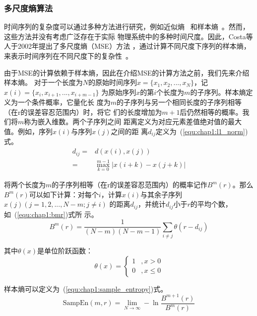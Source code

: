 \subsubsection{多尺度熵算法}

时间序列的复杂度可以通过多种方法进行研究，例如近似熵~\cite{valenza2014inhomogeneous}
和样本熵~\cite{yentes2013appropriate}。然而，这些方法并没有考虑广泛存在于实际
物理系统中的多种时间尺度。因此，Costa等人于2002年提出了多尺度熵（MSE）方法
，通过计算不同尺度下序列的样本熵，来表示时间序列在不同尺度下的复杂性~\cite{costa2002multiscale}。

由于MSE的计算依赖于样本熵，因此在介绍MSE的计算方法之前，我们先来介绍样本熵。
对于一个长度为$N$的原始时间序列$x=\{x_1, x_2, ..., x_N\}$，记$x(i)=\{x_i, x_{i+1}, ..., x_{i+m-1}\}$
为原始序列$x$的第$i$个长度为$m$的子序列。样本熵定义为一个条件概率，它量化长
度为$m$的子序列与另一个相同长度的子序列相等（在r的误差容忍范围内）时，将它
们的长度增加为$m+1$后仍然相等的概率。我们将$m$称为嵌入维数。两个子序列之间
距离定义为对应元素差值绝对值的最大值。例如，序列$x(i)$与序列$x(j)$之间的距
离$d_{ij}$定义为~(\ref{equ:chap1:l1_norm})式。
\begin{equation}
  \label{equ:chap1:l1_norm}
  \begin{aligned}
    d_{ij} = & d(x(i), x(j)) \\
    = & \max_{k=0}^{m-1}|x(i+k)-x(j+k)|
  \end{aligned}
\end{equation}

将两个长度为$m$的子序列相等（在r的误差容忍范围内）的概率记作$B^m(r)$。那么
$B^m(r)$可以如下计算：对每个$i$，计算$x(i)$与其余子序列$x(j)(j=1,2,...,N-m; j\neq i)$
的距离$d_{ij}$，并统计$d_{ij}$小于$r$的平均个数，如~(\ref{equ:chap1:bmr})式所
示。
\begin{equation}
  \label{equ:chap1:bmr}
  B^m(r)=\frac{1}{(N-m)(N-m-1)}\sum_{i\neq j}\theta(r-d_{ij})
\end{equation}

其中$\theta(x)$是单位阶跃函数：
\begin{equation}
  \label{equ:chap1:step_func}
  \theta(x) = \left\{
  \begin{aligned}
    1 &, x > 0 \\
    0 &, x \leq 0
  \end{aligned}
  \right.
\end{equation}

样本熵可以定义为~(\ref{equ:chap1:sample_entropy})式。
\begin{equation}
  \label{equ:chap1:sample_entropy}
  \text{SampEn}(m, r) = \lim_{N\to\infty}-\ln\frac{B^{m+1}(r)}{B^m(r)}
\end{equation}

